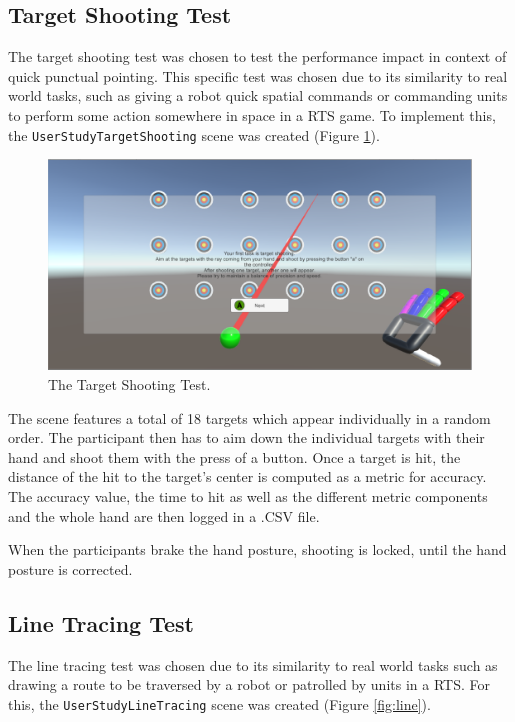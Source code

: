 \subsection{Target Shooting Test}

The target shooting test was chosen to test the performance impact in context of quick punctual pointing. This specific test was chosen due to its similarity to real world tasks, such as giving a robot quick spatial commands or commanding units to perform some action somewhere in space in a RTS game. To implement this, the \texttt{UserStudyTargetShooting} scene was created (Figure \ref{fig:target}).

\begin{figure}
\centering
\includegraphics[width=\textwidth]{targetshootingt}
\caption{The Target Shooting Test.}
\label{fig:target}
\end{figure}

The scene features a total of 18 targets which appear individually in a random order. The participant then has to aim down the individual targets with their hand and shoot them with the press of a button.
Once a target is hit, the distance of the hit to the target's center is computed as a metric for accuracy. The accuracy value, the time to hit as well as the different metric components and the whole hand are then logged in a .CSV file.  

When the participants brake the hand posture, shooting is locked, until the hand posture is corrected. 

\subsection{Line Tracing Test}

The line tracing test was chosen due to its similarity to real world tasks such as drawing a route to be traversed by a robot or patrolled by units in a RTS.
For this, the \texttt{UserStudyLineTracing} scene was created (Figure \ref{fig:line}).

